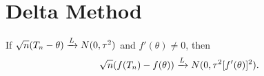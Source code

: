 \section{Delta Method}%
\label{sec:delta_method}

\begin{thm}
    If $\sqrt{n}(T_n - \theta) \xrightarrow{L} N(0, \tau^2)$ and $f'(\theta) \ne 0$, then
    \begin{equation*}
        \sqrt{n}(f(T_n) - f(\theta)) \xrightarrow{L} N(0, \tau^2 [f'(\theta)]^2).
    \end{equation*}
\end{thm}
